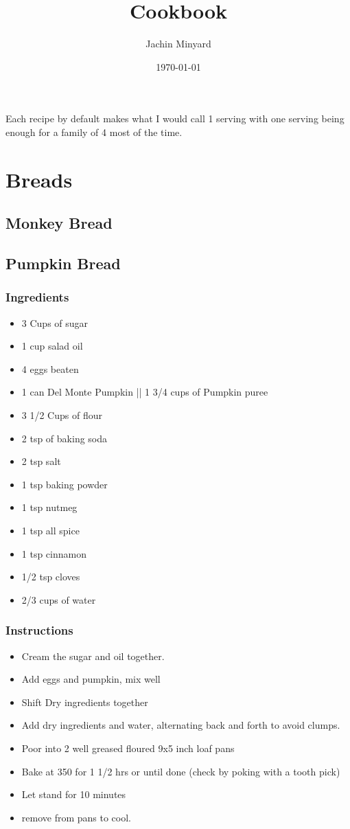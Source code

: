 \documentclass[11pt]{article}
\author{Jachin Minyard}
\date{\today}
\title{Cookbook}
\begin{document}
\maketitle

Each recipe by default makes what I would call 1 serving with one serving being enough for a family of 4 most of the time.
\section{Breads}
\label{sec:org8eadf8c}
\subsection{Monkey Bread}
\label{sec:org1affcaf}
\subsection{Pumpkin Bread}
\label{sec:orgdc52f59}
\subsubsection*{Ingredients}
\label{sec:org53662a1}
\begin{itemize}
\item 3 Cups of sugar
\item 1 cup salad oil
\item 4 eggs beaten
\item 1 can Del Monte Pumpkin || 1 3/4 cups of Pumpkin puree
\item 3 1/2 Cups of flour
\item 2 tsp of baking soda
\item 2 tsp salt
\item 1 tsp baking powder
\item 1 tsp nutmeg
\item 1 tsp all spice
\item 1 tsp cinnamon
\item 1/2 tsp cloves
\item 2/3 cups of water
\end{itemize}
\subsubsection*{Instructions}
\label{sec:org477b20b}
\begin{itemize}
\item Cream the sugar and oil together.
\item Add eggs and pumpkin, mix well
\item Shift Dry ingredients together
\item Add dry ingredients and water, alternating back and forth to avoid clumps.
\item Poor into 2 well greased floured 9x5 inch loaf pans
\item Bake at 350 \degree for 1 1/2 hrs or until done (check by poking with a tooth pick)
\item Let stand for 10 minutes
\item remove from pans to cool.
\end{itemize}
\end{document}
